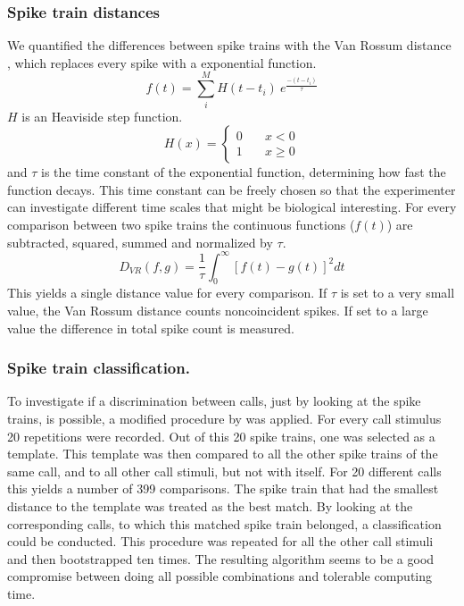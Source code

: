 \documentclass[12pt,a4paper]{article}
\begin{document}
\subsubsection{Spike train distances}
\label{spiketraindistances}
We quantified the  differences between spike trains with the Van Rossum distance \parencite{vanrossum_novel_2001}, which replaces every spike with a exponential function.
\begin{equation}
\label{eq:VR}
f(t) =  \sum_{i}^{M} H(t-t_i)~e^{\frac{-(t-t_i)}{\tau}}
\end{equation}
$H$ is an Heaviside step function.
\begin{equation}
\label{eq:H}
H(x) = \left\{
\begin{array}{ll}
0 & \quad x < 0 \\
1 & \quad x \geq 0
\end{array}
\right.
\end{equation}
and $\tau$ is the time constant of the exponential function, determining how fast the function decays.
This time constant can be freely chosen so that the experimenter can investigate different time scales that might be biological interesting.
For every comparison between two spike trains the continuous functions ($f(t)$) are subtracted, squared, summed and normalized by $\tau$. 
\begin{equation}
\label{eq:VRD}
D_{VR}(f,g) = \frac{1}{\tau} \int_{0}^{\infty}[f(t)-g(t)]^2 dt
\end{equation}
This yields a single distance value for every comparison. If $\tau$ is set to a very small value, the Van Rossum distance counts noncoincident spikes. If set to a large value the difference in total spike count is measured.

\subsubsection{Spike train classification.}
To investigate if a discrimination between calls, just by looking at the spike trains, is possible, a modified procedure by \textcite{machens_single_2003} was applied. For every call stimulus 20 repetitions were recorded. Out of this 20 spike trains, one was selected as a template. This template was then compared to all the other spike trains of the same call, and to all other call stimuli, but not with itself. For 20 different calls this yields a number of 399 comparisons. The spike train that had the smallest distance to the template was treated as the best match. By looking at the corresponding calls, to which this matched spike train belonged, a classification could be conducted. This procedure was repeated for all the other call stimuli and then bootstrapped ten times. The resulting algorithm seems to be a good compromise between doing all possible combinations and tolerable computing time.
\end{document}
